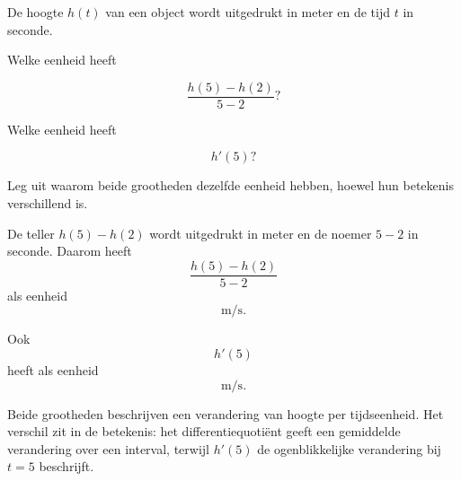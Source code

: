 \documentclass{ximera}
\begin{document}
\begin{oefening}[Eenheden]{\oefB\ESS}

De hoogte $h(t)$ van een object wordt uitgedrukt in meter en de tijd
$t$ in seconde.

\begin{question}
Welke eenheid heeft

\[
\frac{h(5)-h(2)}{5-2}?
\]
\end{question}

\begin{question}
Welke eenheid heeft

\[
h'(5)?
\]
\end{question}

\begin{question}
Leg uit waarom beide grootheden dezelfde eenheid hebben, hoewel hun
betekenis verschillend is.
\end{question}

\begin{oplossing}

De teller $h(5)-h(2)$ wordt uitgedrukt in meter en de noemer $5-2$
in seconde. Daarom heeft
\[
\frac{h(5)-h(2)}{5-2}
\]
als eenheid
\[
\boxed{\mathrm{m/s}}.
\]

Ook
\[
h'(5)
\]
heeft als eenheid
\[
\boxed{\mathrm{m/s}}.
\]

Beide grootheden beschrijven een verandering van hoogte per tijdseenheid.
Het verschil zit in de betekenis: het differentiequotiënt geeft een
gemiddelde verandering over een interval, terwijl $h'(5)$ de
ogenblikkelijke verandering bij $t=5$ beschrijft.

\end{oplossing}

\end{oefening}


\end{document}
